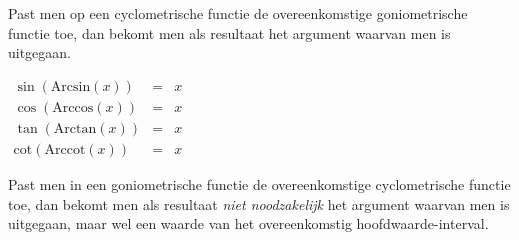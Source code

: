 Past men op een cyclometrische functie de overeenkomstige goniometrische
functie toe, dan bekomt men als resultaat het argument waarvan men
is uitgegaan.

$\begin{array}{ccc}
{\displaystyle \sin\left(\textrm{Arcsin}(x)\right)} & = & x\\
{\displaystyle \cos\left(\textrm{Arccos}(x)\right)} & = & x\\
{\displaystyle \tan\left(\textrm{Arctan}(x)\right)} & = & x\\
{\displaystyle \textrm{cot}\left(\textrm{Arccot}(x)\right)} & = & x
\end{array}$

\medskip{}


\noindent Past men in een goniometrische functie de overeenkomstige
cyclometrische functie toe, dan bekomt men als resultaat \emph{niet
noodzakelijk} het argument waarvan men is uitgegaan, maar wel een
waarde van het overeenkomstig hoofdwaarde-interval.
